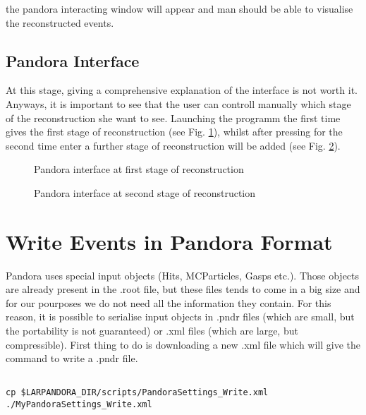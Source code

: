 the pandora interacting window will appear and man should be able to visualise the reconstructed events. 

\subsection{Pandora Interface}  \label{sssec:pandora_inter} 

At this stage, giving a comprehensive explanation of the interface is not worth it. Anyways, it is important to see that the user can controll manually which stage of the reconstruction she want to see. Launching the programm the first time gives the first stage of reconstruction (see Fig. \ref{fig:pandora}), whilst after pressing for the second time enter a further stage of reconstruction will be added (see Fig. \ref{fig:pandora2}).

\begin{figure}[h]
\centering
\caption{Pandora interface at first stage of reconstruction}
\label{fig:pandora}
\end{figure}

\begin{figure}[h]
\centering
\caption{Pandora interface at second stage of reconstruction}
\label{fig:pandora2}
\end{figure}

\section{Write Events in Pandora Format} \label{sssec:intro}

Pandora uses special input objects (Hits, MCParticles, Gasps etc.). Those objects are already present in the .root file, but these files tends to come in a big size and for our pourposes we do not need all the information they contain. For this reason, it is possible to serialise input objects in .pndr files (which are small, but the portability is not guaranteed) or .xml files (which are large, but compressible). First thing to do is downloading a new .xml file which will give the command to write a .pndr file.

\begin{verbatim}

cp $LARPANDORA_DIR/scripts/PandoraSettings_Write.xml ./MyPandoraSettings_Write.xml

\end{verbatim} 

